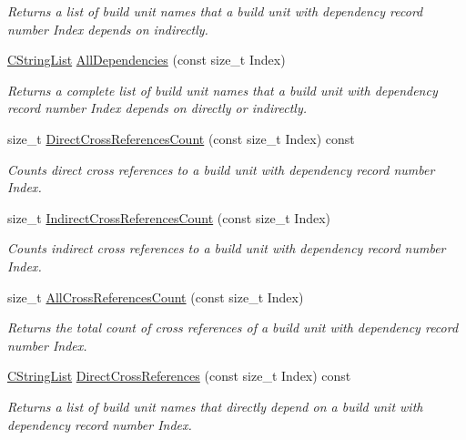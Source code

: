 \begin{DoxyCompactItemize}
\begin{DoxyCompactList}\small\item\em Returns a list of build unit names that a build unit with dependency record number {\itshape Index} depends on indirectly. \end{DoxyCompactList}\item 
\hyperlink{classCStringList}{C\-String\-List} \hyperlink{classCDependencyInfo_a02419d86ae1e14504c8657fb2d62bb4c}{All\-Dependencies} (const size\-\_\-t Index)
\begin{DoxyCompactList}\small\item\em Returns a complete list of build unit names that a build unit with dependency record number {\itshape Index} depends on directly or indirectly. \end{DoxyCompactList}\item 
size\-\_\-t \hyperlink{classCDependencyInfo_a4aa7031586c8dd2cc8dfa8ebc54dd9b2}{Direct\-Cross\-References\-Count} (const size\-\_\-t Index) const 
\begin{DoxyCompactList}\small\item\em Counts direct cross references to a build unit with dependency record number {\itshape Index}. \end{DoxyCompactList}\item 
size\-\_\-t \hyperlink{classCDependencyInfo_a3a4c4419cf30712a16bb71b2f9c7a87c}{Indirect\-Cross\-References\-Count} (const size\-\_\-t Index)
\begin{DoxyCompactList}\small\item\em Counts indirect cross references to a build unit with dependency record number {\itshape Index}. \end{DoxyCompactList}\item 
size\-\_\-t \hyperlink{classCDependencyInfo_aaf613223ecfb1d5decf8b38cb067ae25}{All\-Cross\-References\-Count} (const size\-\_\-t Index)
\begin{DoxyCompactList}\small\item\em Returns the total count of cross references of a build unit with dependency record number {\itshape Index}. \end{DoxyCompactList}\item 
\hyperlink{classCStringList}{C\-String\-List} \hyperlink{classCDependencyInfo_ac1182a8d99046fc6f735576d6b55fc73}{Direct\-Cross\-References} (const size\-\_\-t Index) const 
\begin{DoxyCompactList}\small\item\em Returns a list of build unit names that directly depend on a build unit with dependency record number {\itshape Index}. \end{DoxyCompactList}\item 

\end{DoxyCompactItemize}
